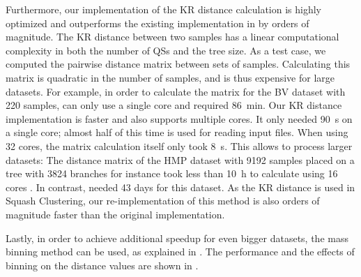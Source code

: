 Furthermore, %
our implementation of the KR distance calculation is highly optimized and
outperforms the existing implementation in  \cite{Matsen2010} by orders of magnitude.
The KR distance between two samples has a linear computational complexity in both the number of \acp{QS} and the tree size.
As a test case, we computed the pairwise distance matrix between sets of samples.
Calculating this matrix is quadratic in the number of samples,
and is thus expensive for large datasets.
For example, in order to calculate the matrix for the \ac{BV} dataset with \num{220} samples,
 can only use a single core and required \SI{86}{\minute}.
Our KR distance implementation  is faster and also supports multiple cores.
It only needed \SI{90}{\second} on a single core; almost half of this time is used for reading input files.
When using \num{32} cores, the matrix calculation itself only took \SI{8}{\second}.
This allows to process larger datasets:
The distance matrix of the \ac{HMP} dataset with \num{9 192} samples placed on a tree with \num{3 824} branches
for instance took less than \SI{10}{\hour} to calculate using \num{16} cores .
In contrast,  needed \num{43} days for this dataset.
As the KR distance is used in Squash Clustering, our re-implementation of this method
is also orders of magnitude faster than the original  implementation.

Lastly, in order to achieve additional speedup for even bigger datasets, the mass binning method can be used,
as explained in .
The performance and the effects of binning on the distance values are shown in .

